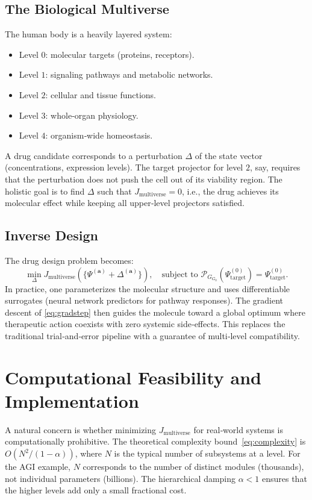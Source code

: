 \documentclass[11pt,a4paper]{article}
\theoremstyle{definition}
\newcommand{\pG}{\mathcal{P}_{\!G}}
\newcommand{\Jfunc}{J_{\text{multiverse}}}
\begin{document}
\subsection{The Biological Multiverse}

The human body is a heavily layered system:
\begin{itemize}
    \item Level $0$: molecular targets (proteins, receptors).
    \item Level $1$: signaling pathways and metabolic networks.
    \item Level $2$: cellular and tissue functions.
    \item Level $3$: whole‑organ physiology.
    \item Level $4$: organism‑wide homeostasis.
\end{itemize}

A drug candidate corresponds to a perturbation $\Delta$ of the state vector (concentrations, expression levels). The target projector for level $2$, say, requires that the perturbation does not push the cell out of its viability region. The holistic goal is to find $\Delta$ such that $\Jfunc=0$, i.e., the drug achieves its molecular effect while keeping all upper‑level projectors satisfied.

\subsection{Inverse Design}

The drug design problem becomes:
\[
\min_{\Delta} \Jfunc(\{\Psi^{(\mathbf{a})} + \Delta^{(\mathbf{a})}\}),\quad \text{subject to } \pG_{G_0} (\Psi^{(0)}_{\text{target}}) = \Psi^{(0)}_{\text{target}}.
\]
In practice, one parameterizes the molecular structure and uses differentiable surrogates (neural network predictors for pathway responses). The gradient descent of \eqref{eq:gradstep} then guides the molecule toward a global optimum where therapeutic action coexists with zero systemic side‑effects. This replaces the traditional trial‑and‑error pipeline with a guarantee of multi‑level compatibility.

\section{Computational Feasibility and Implementation}
\label{sec:feasibility}

A natural concern is whether minimizing $\Jfunc$ for real‑world systems is computationally prohibitive. The theoretical complexity bound~\eqref{eq:complexity} is $O(N^2/(1-\alpha))$, where $N$ is the typical number of subsystems at a level. For the AGI example, $N$ corresponds to the number of distinct modules (thousands), not individual parameters (billions). The hierarchical damping $\alpha<1$ ensures that the higher levels add only a small fractional cost. 
\end{document}
